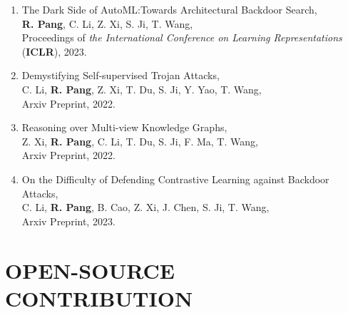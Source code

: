\documentclass[letterpaper,11pt]{article}
\begin{document}
\begin{enumerate}[labelsep=15pt, parsep=-4pt]
    \item The Dark Side of AutoML:\@ Towards Architectural Backdoor Search,\\
    \textbf{R. Pang}, C. Li, Z. Xi, S. Ji, T. Wang,\\
    Proceedings of {\it the International Conference on Learning Representations\/} (\textbf{ICLR}), 2023.
    
    \item Demystifying Self-supervised Trojan Attacks,\\
    C. Li, \textbf{R. Pang}, Z. Xi, T. Du, S. Ji, Y. Yao, T. Wang,\\
    Arxiv Preprint, 2022.
    
    \item Reasoning over Multi-view Knowledge Graphs,\\
    Z. Xi, \textbf{R. Pang}, C. Li, T. Du, S. Ji, F. Ma, T. Wang,\\
    Arxiv Preprint, 2022.

    \item On the Difficulty of Defending Contrastive Learning against Backdoor Attacks,\\
    C. Li, \textbf{R. Pang}, B. Cao, Z. Xi, J. Chen, S. Ji, T. Wang,\\
    Arxiv Preprint, 2023.

    \end{enumerate}
    

\section{OPEN-SOURCE CONTRIBUTION}
\end{document}
